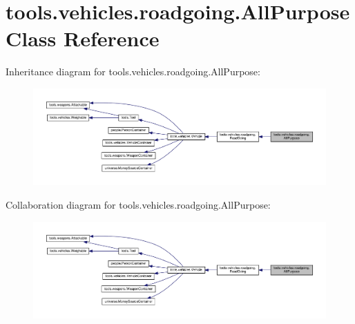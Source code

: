 \hypertarget{classtools_1_1vehicles_1_1roadgoing_1_1_all_purpose}{}\section{tools.\+vehicles.\+roadgoing.\+All\+Purpose Class Reference}
\label{classtools_1_1vehicles_1_1roadgoing_1_1_all_purpose}


Inheritance diagram for tools.\+vehicles.\+roadgoing.\+All\+Purpose\+:
\nopagebreak
\begin{figure}[H]
\begin{center}
\leavevmode
\includegraphics[width=350pt]{classtools_1_1vehicles_1_1roadgoing_1_1_all_purpose__inherit__graph}
\end{center}
\end{figure}


Collaboration diagram for tools.\+vehicles.\+roadgoing.\+All\+Purpose\+:
\nopagebreak
\begin{figure}[H]
\begin{center}
\leavevmode
\includegraphics[width=350pt]{classtools_1_1vehicles_1_1roadgoing_1_1_all_purpose__coll__graph}
\end{center}
\end{figure}
